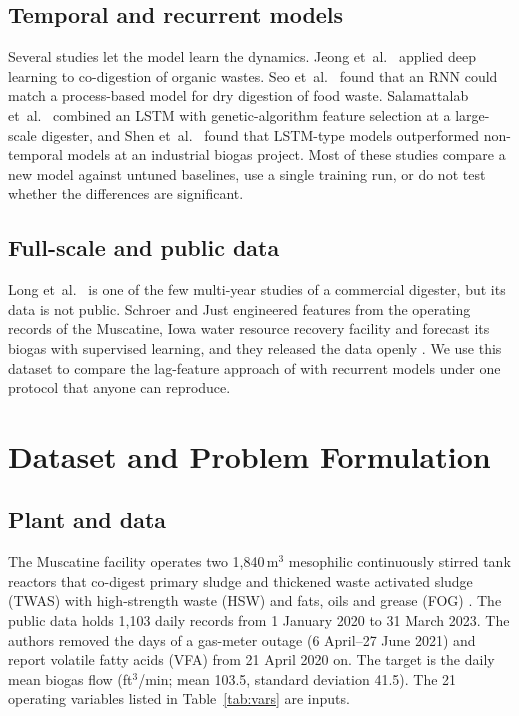 \documentclass[conference]{IEEEtran}
\begin{document}
\subsection{Temporal and recurrent models}
Several studies let the model learn the dynamics. Jeong et~al.~\cite{jeong2021} applied deep
learning to co-digestion of organic wastes. Seo et~al.~\cite{seo2021} found that an RNN could
match a process-based model for dry digestion of food waste. Salamattalab
et~al.~\cite{salamattalab2024} combined an LSTM with genetic-algorithm feature selection at a
large-scale digester, and Shen et~al.~\cite{shen2024} found that LSTM-type models outperformed
non-temporal models at an industrial biogas project. Most of these studies compare a new model
against untuned baselines, use a single training run, or do not test whether the differences
are significant.

\subsection{Full-scale and public data}
Long et~al.~\cite{long2026} is one of the few multi-year studies of a commercial digester, but
its data is not public. Schroer and Just \cite{schroer2024} engineered features from the
operating records of the Muscatine, Iowa water resource recovery facility and forecast its
biogas with supervised learning, and they released the data openly \cite{muscatinedata}. We
use this dataset to compare the lag-feature approach of \cite{long2026} with recurrent models
under one protocol that anyone can reproduce.

\section{Dataset and Problem Formulation}\label{sec:data}

\subsection{Plant and data}
The Muscatine facility operates two 1,840\,m$^3$ mesophilic continuously stirred tank
reactors that co-digest primary sludge and thickened waste activated sludge (TWAS) with
high-strength waste (HSW) and fats, oils and grease (FOG) \cite{schroer2024}. The public data
\cite{muscatinedata} holds 1,103 daily records from 1 January 2020 to 31 March 2023. The
authors removed the days of a gas-meter outage (6 April--27 June 2021) and report volatile fatty
acids (VFA) from 21 April 2020 on. The target is the daily mean biogas flow (ft$^3$/min; mean
103.5, standard deviation 41.5). The 21 operating variables listed in Table~\ref{tab:vars} are
inputs.
\end{document}

